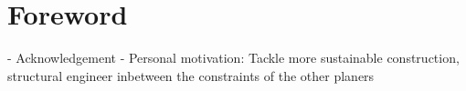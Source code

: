 \chapter*{Foreword}\label{chap:Acknowledgement} 
- Acknowledgement 
- Personal motivation: Tackle more sustainable construction, structural engineer inbetween the constraints of the other planers
